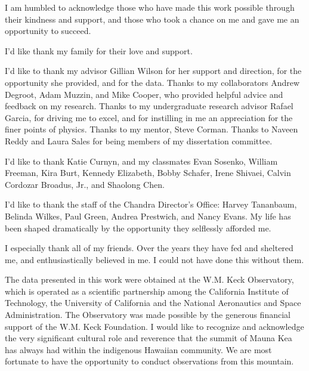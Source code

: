 \begin{acknowledgements}

I am humbled to acknowledge those who have made this work possible through their kindness and support, and those who took a chance on me and gave me an opportunity to succeed.

I'd like thank my family for their love and support.

I'd like to thank my advisor Gillian Wilson for her support and direction, for the opportunity she provided, and for the data.
Thanks to my collaborators Andrew Degroot, Adam Muzzin, and Mike Cooper, who provided helpful advice and feedback on my research.
Thanks to my undergraduate research advisor Rafael Garcia, for driving me to excel, and for instilling in me an appreciation for the finer points of physics.
Thanks to my mentor, Steve Corman.
Thanks to Naveen Reddy and Laura Sales for being members of my dissertation committee.

I'd like to thank Katie Curnyn, and my classmates Evan Sosenko, William Freeman, Kira Burt, Kennedy Elizabeth, Bobby Schafer, Irene Shivaei, Calvin Cordozar Broadus, Jr., and Shaolong Chen.

I'd like to thank the staff of the Chandra Director's Office: Harvey Tananbaum, Belinda Wilkes, Paul Green, Andrea Prestwich, and Nancy Evans.
My life has been shaped dramatically by the opportunity they selflessly afforded me.

I especially thank all of my friends.
Over the years they have fed and sheltered me, and enthusiastically believed in me.
I could not have done this without them.

The data presented in this work were obtained at the W.M. Keck Observatory, which is operated as a scientific partnership among the California Institute of Technology, the University of California and the National Aeronautics and Space Administration. The Observatory was made possible by the generous financial support of the W.M. Keck Foundation. I would like to recognize and acknowledge the very significant cultural role and reverence that the summit of Mauna Kea has always had within the indigenous Hawaiian community.  We are most fortunate to have the opportunity to conduct observations from this mountain.

\end{acknowledgements}
